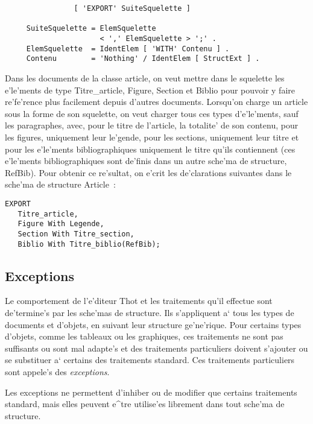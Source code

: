 {\begin{verbatim}
                [ 'EXPORT' SuiteSquelette ]

     SuiteSquelette = ElemSquelette
                      < ',' ElemSquelette > ';' .
     ElemSquelette  = IdentElem [ 'WITH' Contenu ] .
     Contenu        = 'Nothing' / IdentElem [ StructExt ] .
\end{verbatim}

\begin{example}
Dans les documents de la classe article, on veut mettre dans le squelette les 
e'le'ments de type Titre\_article, Figure, Section
et Biblio pour pouvoir y faire re'fe'rence plus facilement depuis
d'autres documents. Lorsqu'on charge un article sous la forme
de son squelette, on veut charger tous ces types d'e'le'ments, sauf les
paragraphes, avec, pour le titre de l'article, la totalite' de son
contenu, pour les figures, uniquement leur le'gende, pour les sections,
uniquement leur titre et pour les e'le'ments bibliographiques uniquement
le titre qu'ils contiennent (ces e'le'ments bibliographiques sont de'finis
dans un autre sche'ma de structure, RefBib). Pour obtenir ce re'sultat,
on e'crit les de'clarations suivantes dans le sche'ma de structure Article~:
\begin{verbatim}
EXPORT
   Titre_article,
   Figure With Legende,
   Section With Titre_section,
   Biblio With Titre_biblio(RefBib);
\end{verbatim}
\end{example}

\subsection{Exceptions}

Le comportement de l'e'diteur Thot et les traitements qu'il effectue sont
de'termine's par les sche'mas de structure. Ils s'appliquent a` tous les
types de documents et d'objets, en suivant leur structure ge'ne'rique.
Pour certains types d'objets, comme les tableaux ou les graphiques, ces
traitements ne sont pas suffisants ou sont mal adapte's et des traitements
particuliers doivent s'ajouter ou se substituer a` certains des traitements
standard. Ces traitements particuliers sont appele's des {\it exceptions}.

Les exceptions ne
permettent d'inhiber ou de modifier que certains traitements standard, mais
elles peuvent e^tre utilise'es librement dans tout sche'ma de structure.

}

